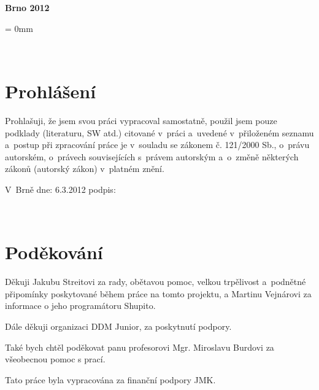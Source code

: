 \documentclass[12pt, a4paper, oneside]{article}
\newcommand{\D}{\medskip \noindent} %
\newcommand{\B}{\textbf} %
\begin{document}
\vspace{20mm}

\begin{center}
\B{Brno 2012}

\end{center}
\normalsize
\newpage  %
\voffset = 0mm %

~ %

\vspace{10mm}

\section*{Prohlášení}

Prohlašuji, že jsem svou práci vypracoval samostatně, použil jsem pouze 
podklady (literaturu, SW atd.) citované v~práci a~uvedené v~přiloženém seznamu 
a~postup při zpracování práce je v~souladu se zákonem č. 121/2000 Sb., o~právu 
autorském, o~právech souvisejících s~právem autorským a~o~změně některých 
zákonů (autorský zákon) v~platném znění. 
 
\vspace{20mm} 
 
\noindent V~Brně  dne: 6.3.2012 \hspace{50mm}                 podpis:   
 

\newpage   %

~ %

\vspace{140mm}

\section*{Poděkování}

 Děkuji Jakubu Streitovi za rady, obětavou pomoc, velkou trpělivost a~podnětné připomínky poskytované během práce na tomto projektu, a Martinu Vejnárovi za informace o jeho programátoru Shupito. %
 
 Dále děkuji organizaci DDM Junior, za poskytnutí podpory.
 
 Také bych chtěl poděkovat panu profesorovi Mgr. Miroslavu Burdovi za všeobecnou pomoc s prací.  

\D Tato práce byla vypracována za finanční podpory JMK.
 
\end{document}
